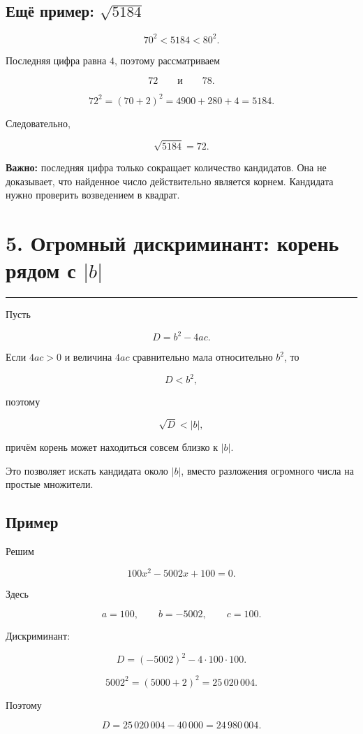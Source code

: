 \documentclass[a4paper,12pt]{article}
\newcommand{\checksection}[1]{%
  \section*{\color{darkaccent}#1}
  \vspace{-0.6em}
  {\color{accent!70}\rule{\linewidth}{0.6pt}}
  \vspace{0.35em}
}
\newcommand{\keyidea}[1]{%
  \textcolor{darkaccent}{\textbf{#1}}
}
\begin{document}
\subsection*{\color{darkaccent}Ещё пример: \(\sqrt{5184}\)}

\[
70^2<5184<80^2.
\]

Последняя цифра равна \(4\), поэтому рассматриваем

\[
72\qquad\text{и}\qquad78.
\]

\[
72^2=(70+2)^2
=4900+280+4
=5184.
\]

Следовательно,

\[
\boxed{\sqrt{5184}=72}.
\]

\keyidea{Важно:} последняя цифра только сокращает количество кандидатов. Она не доказывает, что найденное число действительно является корнем. Кандидата нужно проверить возведением в квадрат.


\checksection{5. Огромный дискриминант: корень рядом с \(\lvert b\rvert\)}

Пусть

\[
D=b^2-4ac.
\]

Если \(4ac>0\) и величина \(4ac\) сравнительно мала относительно \(b^2\), то

\[
D<b^2,
\]

поэтому

\[
\sqrt D<|b|,
\]

причём корень может находиться совсем близко к \(|b|\).

Это позволяет искать кандидата около \(|b|\), вместо разложения огромного числа на простые множители.

\subsection*{\color{darkaccent}Пример}

Решим

\[
100x^2-5002x+100=0.
\]

Здесь

\[
a=100,\qquad b=-5002,\qquad c=100.
\]

Дискриминант:

\[
D=(-5002)^2-4\cdot100\cdot100.
\]

\[
5002^2
=
(5000+2)^2
=
25\,020\,004.
\]

Поэтому

\[
D
=
25\,020\,004-40\,000
=
24\,980\,004.
\]
\end{document}
